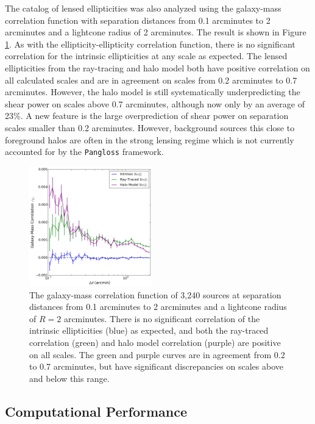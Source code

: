\documentclass[%
 reprint,
 amsmath,amssymb,
 aps,nofootinbib
]{revtex4-1}
\begin{document}
The catalog of lensed ellipticities was also analyzed using the galaxy-mass correlation function with separation distances from 0.1 arcminutes to 2 arcminutes and a lightcone radius of 2 arcminutes. The result is shown in Figure \ref{ng_corr}. As with the ellipticity-ellipticity correlation function, there is no significant correlation for the intrinsic ellipticities at any scale as expected. The lensed ellipticities from the ray-tracing and halo model both have positive correlation on all calculated scales and are in agreement on scales from 0.2 arcminutes to 0.7 arcminutes. However, the halo model is still systematically underpredicting the shear power on scales above 0.7 arcminutes, although now only by an average of 23\%. A new feature is the large overprediction of shear power on separation scales smaller than 0.2 arcminutes. However, background sources this close to foreground halos are often in the strong lensing regime which is not currently accounted for by the \texttt{Pangloss} framework.

\begin{figure}
    \centering
    \includegraphics[width=0.475\textwidth]{figs-swe/ng_corr.png}
    \captionsetup{justification=raggedright,singlelinecheck=false}
    \caption{The galaxy-mass correlation function of 3,240 sources at separation distances from 0.1 arcminutes to 2 arcminutes and a lightcone radius of $R=2$ arcminutes. There is no significant correlation of the intrinsic ellipticities (blue) as expected, and both the ray-traced correlation (green) and halo model correlation (purple) are positive on all scales. The green and purple curves are in agreement from 0.2 to 0.7 arcminutes, but have significant discrepancies on scales above and below this range.}
    \label{ng_corr}
\end{figure}

\subsection*{Computational Performance}
\end{document}
